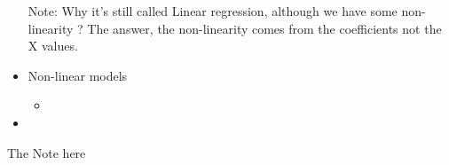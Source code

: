 \documentclass{article}
\begin{document}
\begin{itemize}
Note: Why it's still called Linear regression, although we have some non-linearity ?
The answer, the non-linearity comes from the coefficients not the X values.

  \item Non-linear  models
  \begin{itemize}
    \item 
  \end{itemize}

  \item 
\end{itemize}

\begin{mybox}[title={Note: }]
  The Note here
\end{mybox}
\end{document}
